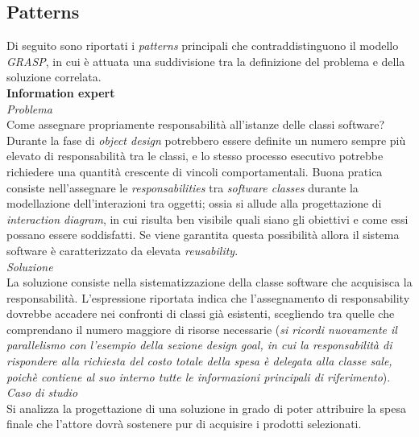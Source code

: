 \documentclass{article}
\begin{document}
\subsection*{Patterns}
\large
Di seguito sono riportati i \textit{patterns} principali che contraddistinguono il modello \textit{GRASP}, in cui è attuata una suddivisione tra la definizione del problema e della soluzione correlata.\vspace*{14pt}\\
\textbf{Information expert}\vspace*{7pt}\\
\textit{Problema}\\
Come assegnare propriamente responsabilità all'istanze delle classi software?\vspace*{7pt}\\
Durante la fase di \textit{object design} potrebbero essere definite un numero sempre più elevato di responsabilità tra le classi, e lo stesso processo esecutivo potrebbe richiedere una quantità crescente di vincoli comportamentali. Buona pratica consiste nell'assegnare le \textit{responsabilities} tra \textit{software classes} durante la modellazione dell'interazioni tra oggetti; 
ossia si allude alla progettazione di \textit{interaction diagram}, in cui risulta ben visibile quali siano gli obiettivi e come essi possano essere soddisfatti. Se viene garantita questa possibilità allora il sistema software è caratterizzato da elevata \textit{reusability}.\vspace*{14pt}\\ 
\textit{Soluzione}\\
La soluzione consiste nella sistematizzazione della classe software che acquisisca la responsabilità. L'espressione riportata indica che l'assegnamento di responsability dovrebbe accadere nei confronti di classi già esistenti, scegliendo tra quelle che comprendano il numero maggiore di risorse necessarie (\textit{si ricordi nuovamente il parallelismo con l'esempio della sezione design goal, in cui la responsabilità di rispondere alla richiesta del costo totale della spesa è delegata alla classe sale, poichè contiene al suo interno tutte le informazioni principali di riferimento}).\vspace*{14pt}\\
\textit{Caso di studio}\\
Si analizza la progettazione di una soluzione in grado di poter attribuire la spesa finale che l'attore dovrà sostenere pur di acquisire i prodotti selezionati.
\end{document}
